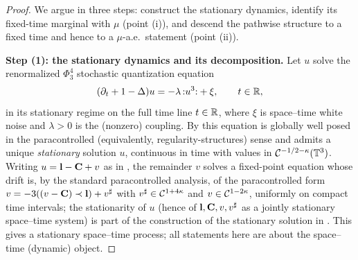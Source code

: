 \begin{proof}
We argue in three steps: construct the stationary dynamics, identify its
fixed-time marginal with $\mu$ (point (i)), and descend the pathwise structure to
a fixed time and hence to a $\mu$-a.e.\ statement (point (ii)).

\medskip
\textbf{Step (1): the stationary dynamics and its decomposition.}
Let $u$ solve the renormalized $\Phi^4_3$ stochastic quantization equation
\begin{equation}\label{eq:sqe}
(\partial_t+1-\Delta)u=-\lambda\,{:}u^3{:}+\xi ,\qquad t\in\mathbb{R},
\end{equation}
in its stationary regime on the full time line $t\in\mathbb{R}$, where $\xi$ is
space--time white noise and $\lambda>0$ is the (nonzero) coupling. By
\cite{HM18,CC18,EW24} this equation is globally well posed in the
paracontrolled (equivalently, regularity-structures) sense and admits a unique
\emph{stationary} solution $u$, continuous in time with values in
$\mathcal{C}^{-1/2-\kappa}(\mathbb{T}^3)$. Writing $u=\mathbf{l}-\mathbf{C}+v$ as in \cite{CC18}, the
remainder $v$ solves a fixed-point equation whose drift is, by the standard
paracontrolled analysis, of the para\-controlled form
$v=-3((v-\mathbf{C})\prec\mathbf{l})+v^\sharp$ with $v^\sharp\in\mathcal{C}^{1+4\kappa}$ and
$v\in\mathcal{C}^{1-2\kappa}$, uniformly on compact time intervals; the stationarity of
$u$ (hence of $\mathbf{l},\mathbf{C},v,v^\sharp$ as a jointly stationary space--time
system) is part of the construction of the stationary solution in \cite{EW24}.
This gives a stationary space--time process; all statements here are about the
space--time (dynamic) object.


\end{proof}
